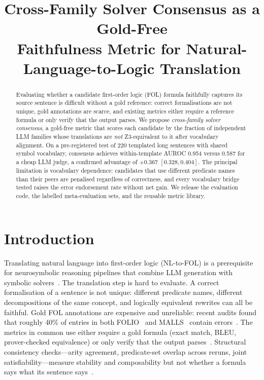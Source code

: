 \documentclass[11pt,letterpaper]{article}
\title{Cross-Family Solver Consensus as a Gold-Free\\Faithfulness Metric for Natural-Language-to-Logic Translation}
\author{}
\date{}
\begin{document}
\maketitle

\begin{abstract}
Evaluating whether a candidate first-order logic (FOL) formula faithfully captures its source sentence is difficult without a gold reference: correct formalisations are not unique, gold annotations are scarce, and existing metrics either require a reference formula or only verify that the output parses.
We propose \emph{cross-family solver consensus}, a gold-free metric that scores each candidate by the fraction of independent LLM families whose translations are \emph{not} Z3-equivalent to it after vocabulary alignment.
On a pre-registered test of 220 templated long sentences with shared symbol vocabulary, consensus achieves within-template AUROC 0.954 versus 0.587 for a cheap LLM judge, a confirmed advantage of $+0.367$ $[0.328, 0.404]$.
The principal limitation is vocabulary dependence: candidates that use different predicate names than their peers are penalised regardless of correctness, and every vocabulary bridge tested raises the error endorsement rate without net gain.
We release the evaluation code, the labelled meta-evaluation sets, and the reusable metric library.
\end{abstract}

\section{Introduction}
\label{sec:intro}

Translating natural language into first-order logic (NL-to-FOL) is a prerequisite for neurosymbolic reasoning pipelines that combine LLM generation with symbolic solvers~\citep{Pan2023, Ryu2024}.
The translation step is hard to evaluate.
A correct formalisation of a sentence is not unique: different predicate names, different decompositions of the same concept, and logically equivalent rewrites can all be faithful.
Gold FOL annotations are expensive and unreliable: recent audits found that roughly 40\% of entries in both FOLIO~\citep{Han2022} and MALLS~\citep{Granelli2023} contain errors~\citep{Brunello2026}.
The metrics in common use either require a gold formula (exact match, BLEU, prover-checked equivalence) or only verify that the output parses~\citep{Yang2023, Vossel2025}.
Structural consistency checks---arity agreement, predicate-set overlap across reruns, joint satisfiability---measure stability and composability but not whether a formula says what its sentence says~\citep{Thatikonda2025}.
\end{document}
